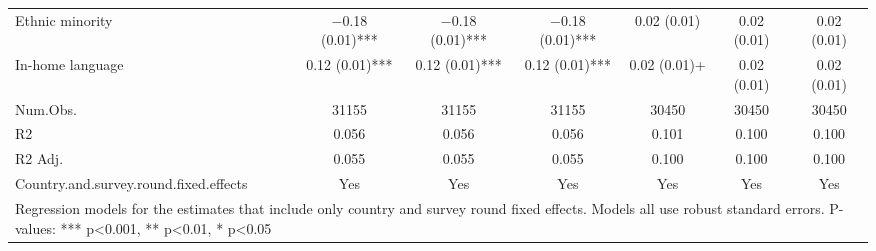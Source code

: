 \begin{table}[H]
\begin{tabular}[t]{lcccccc}
Ethnic minority & \num{-0.18} (\num{0.01})*** & \num{-0.18} (\num{0.01})*** & \num{-0.18} (\num{0.01})*** & \num{0.02} (\num{0.01}) & \num{0.02} (\num{0.01}) & \num{0.02} (\num{0.01})\\
In-home language & \num{0.12} (\num{0.01})*** & \num{0.12} (\num{0.01})*** & \num{0.12} (\num{0.01})*** & \num{0.02} (\num{0.01})+ & \num{0.02} (\num{0.01}) & \num{0.02} (\num{0.01})\\
\midrule
Num.Obs. & \num{31155} & \num{31155} & \num{31155} & \num{30450} & \num{30450} & \num{30450}\\
R2 & \num{0.056} & \num{0.056} & \num{0.056} & \num{0.101} & \num{0.100} & \num{0.100}\\
R2 Adj. & \num{0.055} & \num{0.055} & \num{0.055} & \num{0.100} & \num{0.100} & \num{0.100}\\
Country.and.survey.round.fixed.effects & Yes & Yes & Yes & Yes & Yes & Yes\\
\bottomrule
\multicolumn{7}{l}{\rule{0pt}{1em}Regression models for the estimates that include only country and survey round fixed effects. Models all use robust standard errors. P-values: *** p<0.001, ** p<0.01, * p<0.05}\\
\end{tabular}
\end{table}
